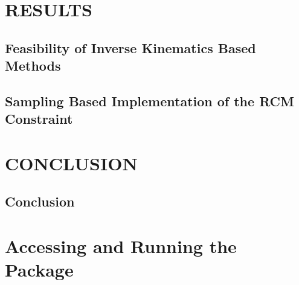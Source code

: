 \documentclass[BTech]{iitmdiss}
\begin{document}
    \chapter{RESULTS}\label{ch:results}


    \section{Feasibility of Inverse Kinematics Based Methods}



    \section{Sampling Based Implementation of the RCM Constraint}



    \chapter{CONCLUSION}\label{ch:conclusion}


    \section{Conclusion}




    \appendix


    \chapter{Accessing and Running the Package} \label{ch:code}


    \begin{singlespace}
        
    \end{singlespace}
\end{document}
